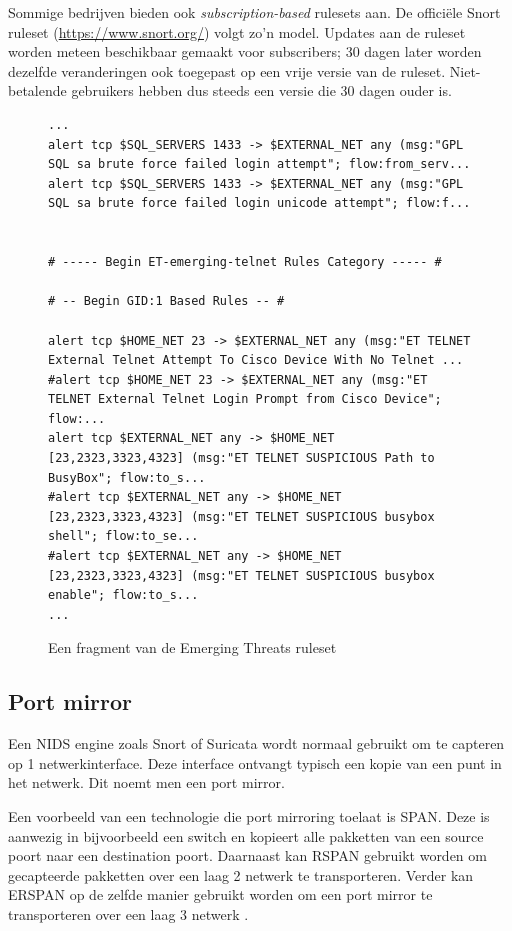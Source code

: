 \documentclass[a4paper,12pt]{report}
\begin{document}
Sommige bedrijven bieden ook \emph{subscription-based} rulesets aan.
De officiële Snort ruleset (\url{https://www.snort.org/}) volgt zo'n model.
Updates aan de ruleset worden meteen beschikbaar gemaakt voor subscribers; 30 dagen later worden dezelfde veranderingen ook toegepast op een vrije versie van de ruleset.
Niet-betalende gebruikers hebben dus steeds een versie die 30 dagen ouder is.

\begin{figure}[H]
  \begin{lstlisting}[basicstyle=\ttfamily\scriptsize]
...
alert tcp $SQL_SERVERS 1433 -> $EXTERNAL_NET any (msg:"GPL SQL sa brute force failed login attempt"; flow:from_serv...
alert tcp $SQL_SERVERS 1433 -> $EXTERNAL_NET any (msg:"GPL SQL sa brute force failed login unicode attempt"; flow:f...


# ----- Begin ET-emerging-telnet Rules Category ----- #

# -- Begin GID:1 Based Rules -- #

alert tcp $HOME_NET 23 -> $EXTERNAL_NET any (msg:"ET TELNET External Telnet Attempt To Cisco Device With No Telnet ...
#alert tcp $HOME_NET 23 -> $EXTERNAL_NET any (msg:"ET TELNET External Telnet Login Prompt from Cisco Device"; flow:...
alert tcp $EXTERNAL_NET any -> $HOME_NET [23,2323,3323,4323] (msg:"ET TELNET SUSPICIOUS Path to BusyBox"; flow:to_s...
#alert tcp $EXTERNAL_NET any -> $HOME_NET [23,2323,3323,4323] (msg:"ET TELNET SUSPICIOUS busybox shell"; flow:to_se...
#alert tcp $EXTERNAL_NET any -> $HOME_NET [23,2323,3323,4323] (msg:"ET TELNET SUSPICIOUS busybox enable"; flow:to_s...
...
  \end{lstlisting}
  \caption{Een fragment van de Emerging Threats ruleset}
  \label{fig:et-voorbeeld}
\end{figure}

\subsection{Port mirror}
Een NIDS engine zoals Snort of Suricata wordt normaal gebruikt om te capteren op 1 netwerkinterface.
Deze interface ontvangt typisch een kopie van een punt in het netwerk.
Dit noemt men een port mirror.

Een voorbeeld van een technologie die port mirroring toelaat is SPAN.
Deze is aanwezig in bijvoorbeeld een switch en kopieert alle pakketten van een source poort naar een destination poort.
Daarnaast kan RSPAN gebruikt worden om gecapteerde pakketten over een laag 2 netwerk te transporteren.
Verder kan ERSPAN op de zelfde manier gebruikt worden om een port mirror te transporteren over een laag 3 netwerk \autocite{cisco:span}.
\end{document}
